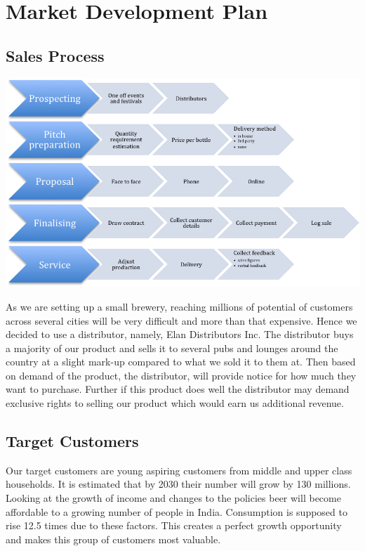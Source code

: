 \documentclass[11pt]{article}
\begin{document}

\section{Market Development Plan}
  \subsection{Sales Process}
  \includegraphics[width=\textwidth,keepaspectratio]{./process.png}

As we are setting up a small brewery, reaching millions of potential of
customers across several cities will be very difficult and more than that
expensive. Hence we decided to use a distributor, namely, Elan Distributors Inc.
The distributor buys a majority of our product and sells it to several pubs and
lounges around the country at a slight mark-up compared to what we sold it to
them at. Then based on demand of the product, the distributor, will provide
notice for how much they want to purchase. Further if this product does well
the distributor may demand exclusive rights to selling our product which would
earn us additional revenue.

  \subsection{Target Customers}
Our target customers are young aspiring customers from middle and upper class
households. It is estimated that by 2030 their number will grow by 130 millions.
Looking at the growth of income and changes to the policies beer will become
affordable to a growing number of people in India. Consumption is supposed to
rise 12.5 times due to these factors. This creates a perfect growth opportunity
and makes this group of customers most valuable.
\end{document}
